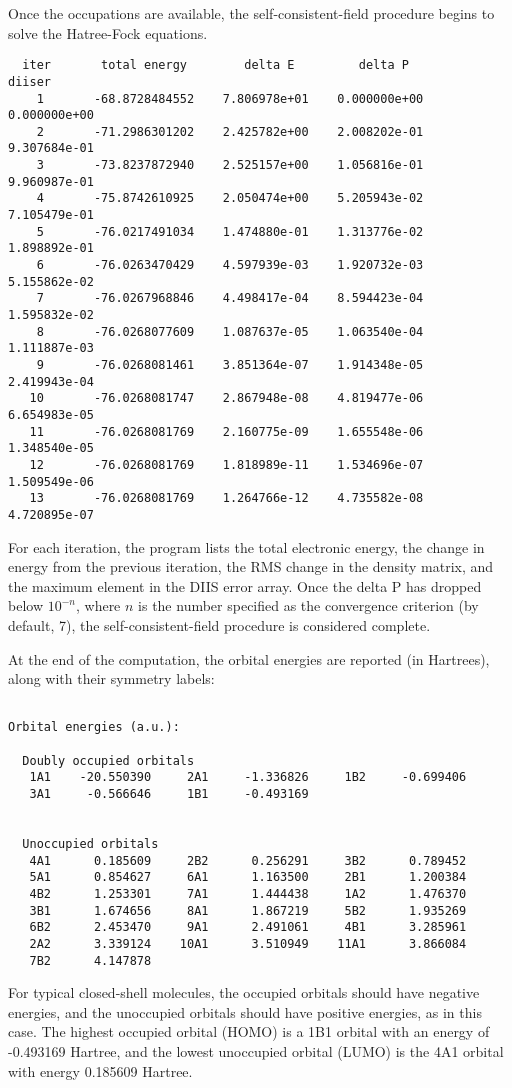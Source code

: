 Once the occupations are available, the self-consistent-field procedure
begins to solve the Hatree-Fock equations.  
\begin{verbatim}
  iter       total energy        delta E         delta P          diiser
    1       -68.8728484552    7.806978e+01    0.000000e+00    0.000000e+00
    2       -71.2986301202    2.425782e+00    2.008202e-01    9.307684e-01
    3       -73.8237872940    2.525157e+00    1.056816e-01    9.960987e-01
    4       -75.8742610925    2.050474e+00    5.205943e-02    7.105479e-01
    5       -76.0217491034    1.474880e-01    1.313776e-02    1.898892e-01
    6       -76.0263470429    4.597939e-03    1.920732e-03    5.155862e-02
    7       -76.0267968846    4.498417e-04    8.594423e-04    1.595832e-02
    8       -76.0268077609    1.087637e-05    1.063540e-04    1.111887e-03
    9       -76.0268081461    3.851364e-07    1.914348e-05    2.419943e-04
   10       -76.0268081747    2.867948e-08    4.819477e-06    6.654983e-05
   11       -76.0268081769    2.160775e-09    1.655548e-06    1.348540e-05
   12       -76.0268081769    1.818989e-11    1.534696e-07    1.509549e-06
   13       -76.0268081769    1.264766e-12    4.735582e-08    4.720895e-07
\end{verbatim}
For each iteration, the program lists the total electronic energy, the
change in energy from the previous iteration, the RMS change in the
density matrix, and the maximum element in the DIIS error array.  Once
the delta P has dropped below $10^{-n}$, where $n$ is the number specified
as the convergence criterion (by default, 7), the self-consistent-field
procedure is considered complete.  

At the end of the computation, the orbital energies are reported (in 
Hartrees), along with their symmetry labels:
\begin{verbatim}
 
Orbital energies (a.u.):
                                                                                
  Doubly occupied orbitals
   1A1    -20.550390     2A1     -1.336826     1B2     -0.699406
   3A1     -0.566646     1B1     -0.493169
                                                                                
                                                                                
  Unoccupied orbitals
   4A1      0.185609     2B2      0.256291     3B2      0.789452
   5A1      0.854627     6A1      1.163500     2B1      1.200384
   4B2      1.253301     7A1      1.444438     1A2      1.476370
   3B1      1.674656     8A1      1.867219     5B2      1.935269
   6B2      2.453470     9A1      2.491061     4B1      3.285961
   2A2      3.339124    10A1      3.510949    11A1      3.866084
   7B2      4.147878

\end{verbatim}
For typical closed-shell molecules, the occupied orbitals should have
negative energies, and the unoccupied orbitals should have positive
energies, as in this case.  The highest occupied orbital (HOMO) is
a 1B1 orbital with an energy of -0.493169 Hartree, and the lowest
unoccupied orbital (LUMO) is the 4A1 orbital with energy 0.185609 Hartree.

